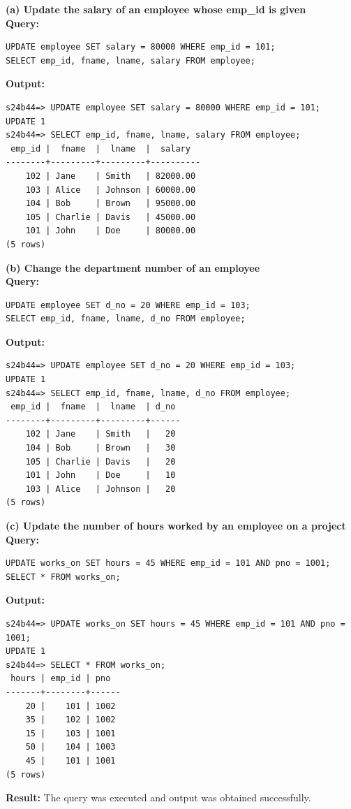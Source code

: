 \documentclass[12pt, a4paper]{article}
\begin{document}
\textbf{(a) Update the salary of an employee whose emp\_id is given}\\
\textbf{Query:}
\begin{lstlisting}
UPDATE employee SET salary = 80000 WHERE emp_id = 101;
SELECT emp_id, fname, lname, salary FROM employee;
\end{lstlisting}
\textbf{Output:}
\begin{lstlisting}[style=terminal]
s24b44=> UPDATE employee SET salary = 80000 WHERE emp_id = 101;
UPDATE 1
s24b44=> SELECT emp_id, fname, lname, salary FROM employee;
 emp_id |  fname  |  lname  |  salary  
--------+---------+---------+----------
    102 | Jane    | Smith   | 82000.00
    103 | Alice   | Johnson | 60000.00
    104 | Bob     | Brown   | 95000.00
    105 | Charlie | Davis   | 45000.00
    101 | John    | Doe     | 80000.00
(5 rows)
\end{lstlisting}

\textbf{(b) Change the department number of an employee}\\
\textbf{Query:}
\begin{lstlisting}
UPDATE employee SET d_no = 20 WHERE emp_id = 103;
SELECT emp_id, fname, lname, d_no FROM employee;
\end{lstlisting}
\textbf{Output:}
\begin{lstlisting}[style=terminal]
s24b44=> UPDATE employee SET d_no = 20 WHERE emp_id = 103;
UPDATE 1
s24b44=> SELECT emp_id, fname, lname, d_no FROM employee;
 emp_id |  fname  |  lname  | d_no 
--------+---------+---------+------
    102 | Jane    | Smith   |   20
    104 | Bob     | Brown   |   30
    105 | Charlie | Davis   |   20
    101 | John    | Doe     |   10
    103 | Alice   | Johnson |   20
(5 rows)
\end{lstlisting}

\textbf{(c) Update the number of hours worked by an employee on a project}\\
\textbf{Query:}
\begin{lstlisting}
UPDATE works_on SET hours = 45 WHERE emp_id = 101 AND pno = 1001;
SELECT * FROM works_on;
\end{lstlisting}
\textbf{Output:}
\begin{lstlisting}[style=terminal]
s24b44=> UPDATE works_on SET hours = 45 WHERE emp_id = 101 AND pno = 1001;
UPDATE 1
s24b44=> SELECT * FROM works_on;
 hours | emp_id | pno  
-------+--------+------
    20 |    101 | 1002
    35 |    102 | 1002
    15 |    103 | 1001
    50 |    104 | 1003
    45 |    101 | 1001
(5 rows)
\end{lstlisting}
\textbf{Result:} The query was executed and output was obtained successfully.
\end{document}
